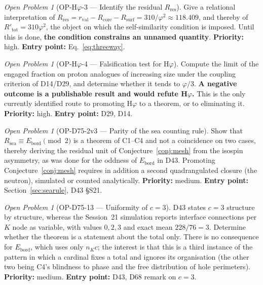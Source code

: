 \documentclass[11pt,a4paper]{article}
\newcommand{\Rsea}{R_{\mathrm{sea}}}
\newcommand{\Rres}{R_{\mathrm{res}}}
\theoremstyle{plain}
\theoremstyle{definition}
\theoremstyle{remark}
\newtheorem{openproblem}[theorem]{Open Problem}
\newcommand{\rval}{r_{\mathrm{val}}}
\newcommand{\Rsurf}{R_{\mathrm{surf}}}
\begin{document}
\begin{openproblem}[OP-H$\varphi$-3 --- Identify the residual $\Rres$]
\label{op:Hphi3}
Give a relational interpretation of $\Rres=\rval-R_{\mathrm{core}}-\Rsurf=310/\varphi^2\approx118.409$, and thereby of $R'_{\mathrm{tot}}=310\varphi^2$, the object on which the self-similarity condition is imposed. Until this is done, \textbf{the condition constrains an unnamed quantity}. \textbf{Priority:} high. \textbf{Entry point:} Eq.~\eqref{eq:threeway}.
\end{openproblem}

\begin{openproblem}[OP-H$\varphi$-4 --- Falsification test for H$\varphi$]
\label{op:Hphi4}
Compute the limit of the engaged fraction on proton analogues of increasing size under the coupling criterion of D14/D29, and determine whether it tends to $\varphi/3$. \textbf{A negative outcome is a publishable result and would refute H$\varphi$.} This is the only currently identified route to promoting H$\varphi$ to a theorem, or to eliminating it. \textbf{Priority:} high. \textbf{Entry point:} D29, D14.
\end{openproblem}

\begin{openproblem}[OP-D75-2v3 --- Parity of the sea counting rule]
\label{op:D752v3}
Show that $\Rsea\equiv E_{\mathrm{bord}} \pmod 2$ is a theorem of C1--C4 and not a coincidence on two cases, thereby deriving the residual unit of Conjecture~\ref{conj:mesh} from the isospin asymmetry, as was done for the oddness of $E_{\mathrm{bord}}$ in D43. Promoting Conjecture~\ref{conj:mesh} requires in addition a second quadrangulated closure (the neutron), simulated or counted analytically. \textbf{Priority:} medium. \textbf{Entry point:} Section~\ref{sec:searule}, D43 §S21.
\end{openproblem}

\begin{openproblem}[OP-D75-13 --- Uniformity of $c=3$]
\label{op:D7513}
D43 states $c=3$ structure by structure, whereas the Session~21 simulation reports interface connections per $K$ node as variable, with values $0,2,3$ and exact mean $228/76=3$. Determine whether the theorem is a statement about the total only. There is no consequence for $E_{\mathrm{bord}}$, which uses only $n_K c$; the interest is that this is a third instance of the pattern in which a cardinal fixes a total and ignores its organisation (the other two being C4's blindness to phase and the free distribution of hole perimeters). \textbf{Priority:} medium. \textbf{Entry point:} D43, D68 remark on $c=3$.
\end{openproblem}
\end{document}
